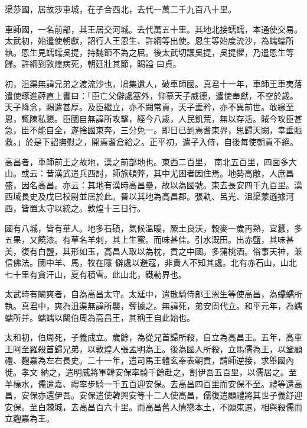 \begin{pinyinscope}
 渠莎國，居故莎車城，在子合西北，去代一萬二千九百八十里。



 車師國，一名前部，其王居交河城。去代萬五十里。其地北接蠕蠕，本通使交易。太武初，始遣使朝獻，詔行人王恩生、許綱等出使。恩生等始度流沙，為蠕蠕所執。恩生見蠕蠕吳提，持魏節不為之屈。後太武切讓吳提，吳提懼，乃遣恩生等歸。許綱到敦煌病死，朝廷壯其節，賜謚
 曰貞。



 初，沮渠無諱兄弟之渡流沙也，鳩集遺人，破車師國。真君十一年，車師王車夷落遣使琢進薛直上書曰：「臣亡父僻處塞外，仰慕天子威德，遣使奉獻，不空於歲。天子降念，賜遣甚厚。及臣繼立，亦不闕常貢，天子垂矜，亦不異前世。敢緣至恩，輒陳私懇。臣國自無諱所攻擊，經今八歲，人民飢荒，無以存活。賊今攻臣甚急，臣不能自全，遂捨國東奔，三分免一。即日已到焉耆東界，思歸天闕，幸垂賑救。」於是下詔撫慰之，開焉耆倉給之。正平初，遣子入侍，自後每使朝貢不絕。



 高昌者，車師前王之故地，漢之前部地也。東西二百里，
 南北五百里，四面多大山。或云：昔漢武遣兵西討，師旅頓弊，其中尤困者因住焉。地勢高敞，人庶昌盛，因名高昌。亦云：其地有漢時高昌壘，故以為國號。東去長安四千九百里。漢西域長史及戊巳校尉並居於此。晉以其地為高昌郡。張軌、呂光、沮渠蒙遜據河西，皆置太守以統之。敦煌十三日行。



 國有八城，皆有華人。地多石磧，氣候溫暖，厥土良沃，穀麥一歲再熟，宜蠶，多五果，又饒漆。有草名羊刺，其上生蜜。而味甚佳。引水溉田。出赤鹽，其味甚美，復有白鹽，其形如玉，高昌人取以為枕，貢之中國。多蒲桃酒。俗事天神，兼信佛法。國中羊、馬，牧在隱
 僻處以避寇，非貴人不知其處。北有赤石山，山北七十里有貪汗山，夏有積雪。此山北，鐵勒界也。



 太武時有闞爽者，自為高昌太守。太延中，遣散騎侍郎王恩生等使高昌，為蠕蠕所執。真君中，爽為沮渠無諱所襲，奪據之。無諱死，弟安周代立。和平元年，為蠕蠕所并。蠕蠕以闞伯周為高昌王，其稱王自此始也。



 太和初，伯周死，子義成立。歲餘，為從兄首歸所殺，自立為高昌王。五年，高車王阿至羅殺首歸兄弟，以敦煌人張孟明為王。後為國人所殺，立馬儒為王，以鞏顧禮、麴嘉為左右長史。二十一年，遣司馬王體玄奉表朝貢，請師逆接，求舉國內徙。孝文
 納之，遣明威將軍韓安保率騎千餘赴之，割伊吾五百里，以儒居之。至羊榛水，儒遣嘉、禮率步騎一千五百迎安保。去高昌四百里而安保不至。禮等還高昌，安保亦還伊吾。安保遣使韓興安等十二人使高昌，儒復遣顧禮將其世子義舒迎安保。至白棘城，去高昌百六十里。而高昌舊人情戀本土，不願東遷，相與殺儒而立麴嘉為王。




\end{pinyinscope}
